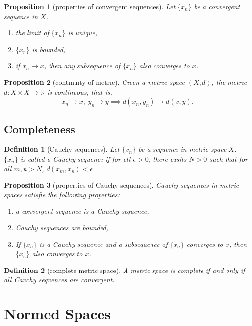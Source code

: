 \documentclass{report}
\newtheorem{definition}{Definition}[section]
\newtheorem{proposition}{Proposition}[section]
\theoremstyle{nonumberplain}
\begin{document}
\begin{proposition}[properties of convergent sequences]
	Let $\{x_n\}$ be a convergent sequence in $X$.
	\begin{enumerate}
		\item the limit of $\{x_n\}$ is unique,
		\item $\{x_n\}$ is bounded,
		\item if $x_n\to x$, then any subsequence of $\{x_n\}$ also converges to $x$.
	\end{enumerate}	
\end{proposition}

\begin{proposition}[continuity of metric]
	Given a metric space $(X,d)$, the metric $d:X\times X\to \mathbb{R}$ is continuous, that is,
	\[
		x_n\to x,\; y_n\to y\implies d(x_n,y_n)\to d(x,y).
	\]
\end{proposition}
\subsection{Completeness}
\begin{definition}[Cauchy sequences]
	Let $\{x_n\}$ be a sequence in metric space $X$. $\{x_n\}$ is called a \emph{Cauchy sequence} if for all $\epsilon>0$, there exsits $N>0$ such that for all $m,n>N$, $d(x_m,x_n)<\epsilon$.
\end{definition}

\begin{proposition}[properties of Cauchy sequences]
	Cauchy sequences in metric spaces satisfie the following properties:
	\begin{enumerate}
		\item a convergent sequence is a Cauchy sequence,
		\item Cauchy sequences are bounded,
		\item If $\{x_n\}$ is a Cauchy sequence and a subsequence of $\{x_n\}$ converges to $x$, then $\{x_n\}$ also converges to $x$.
	\end{enumerate}	
\end{proposition}

\begin{definition}[complete metric space]
	A metric space is \emph{complete} if and only if all Cauchy sequences are convergent.
\end{definition}

\section{Normed Spaces}
\end{document}
